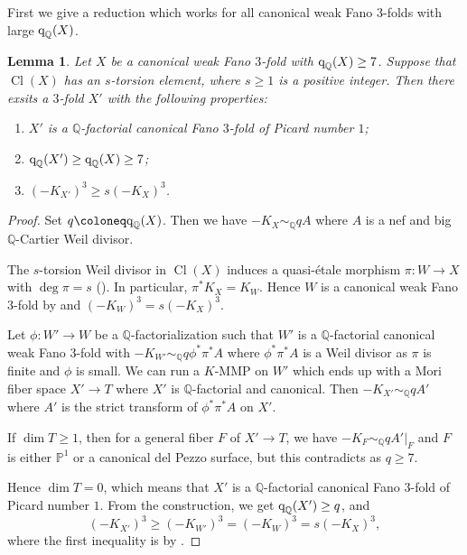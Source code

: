 \documentclass[12pt,twoside]{amsart}
\DeclareMathOperator{\Cl}{Cl}
\newcommand{\qQ}{\text{\rm q}_{\mathbb{Q}}}
\newtheorem{lem}[thm]{Lemma}
\theoremstyle{definition}
\begin{document}
First we give a reduction which works for all canonical weak Fano $3$-folds with large $\qQ(X)$.
\begin{lem}\label{lem modification}
 Let $X$ be a canonical weak Fano $3$-fold with $\qQ(X)\geq 7$. 
 Suppose that $\Cl (X)$ has an $s$-torsion element, where $s\geq 1$ is a positive integer.
 Then there exsits a $3$-fold $X'$ with the following properties:
 \begin{enumerate}
 \item $X'$ is a $\mathbb Q$-factorial canonical Fano $3$-fold of Picard number $1$;
 
 \item $\qQ(X')\geq \qQ(X)\geq 7$;

 \item $(-K_{X'})^3\geq s(-K_X)^3$. 
 \end{enumerate}
\end{lem}
\begin{proof}
Set $q\coloneq \qQ(X)$. Then we have $-K_X\sim_{\mathbb{Q}}qA$ where $A$ is a nef and big $\mathbb{Q}$-Cartier Weil divisor.

The $s$-torsion Weil divisor in $\Cl (X)$ induces a quasi-\'etale morphism $\pi\colon W\to X$ with $\deg \pi=s$ (\cite[Definition~2.52]{KollarMori1998}). In particular, $\pi^*K_X=K_W$. Hence $W$ is a canonical weak Fano $3$-fold by \cite[Proposition~5.20]{KollarMori1998} and $(-K_{W})^3=s(-K_{X })^3$. 

Let $\phi\colon W'\to W$ be a $\mathbb{Q}$-factorialization such that $W'$ is a $\mathbb{Q}$-factorial canonical weak Fano $3$-fold with $-K_{W'}\sim_{\mathbb{Q}}q \phi^* \pi^*A$ where $\phi^* \pi^*A$ is a Weil divisor as $\pi$ is finite and $\phi$ is small. We can run a $K$-MMP on $W'$ which ends up with a Mori fiber space $X'\to T$ where $X'$ is $\mathbb{Q}$-factorial and canonical. Then $-K_{X'}\sim_{\mathbb{Q}}q A'$ where $A'$ is the strict transform of $\phi^* \pi^*A$ on $X'$.

If $\dim T\geq 1$, then for a general fiber $F$ of $X'\to T$, we have $-K_F\sim_{\mathbb{Q}}q A'|_F$ and $F$ is either $\mathbb{P}^1$ or a canonical del Pezzo surface, but this contradicts \cite[Proposition~3.3]{WangCX2024} as $q\geq 7$.

Hence $\dim T=0$, which means that $X'$ is a $\mathbb Q$-factorial canonical Fano $3$-fold of Picard number $1$. From the construction, we get $ \qQ(X')\geq q$, and 
\[
 (-K_{X'})^3\geq (-K_{W'})^3=(-K_{W})^3=s(-K_{X })^3,
\] 
where the first inequality is by \cite[Lemma~4.4]{Jiang2021}.
\end{proof}
\end{document}
